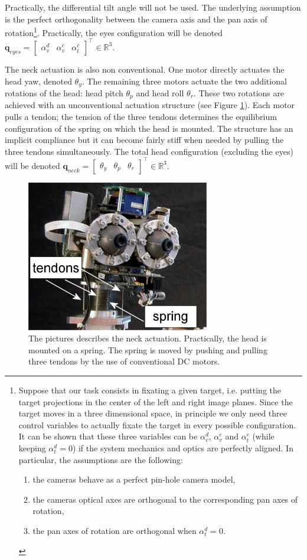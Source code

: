 Practically, the differential tilt angle will not be used. The underlying assumption is the perfect orthogonality between the camera axis and the pan axis of rotation\footnote{\samepage Suppose that our task consists in fixating a given target, i.e. putting the target projections in the center of the left and right image planes. Since the target moves in a three dimensional space, in principle we only need three control variables to actually fixate the target in every possible configuration. It can be shown that these three variables can be $\alpha_v^d$, $\alpha_v^c$ and $\alpha_t^c$ (while keeping $\alpha_t^d=0$) if the system mechanics and optics are perfectly aligned. In particular, the assumptions are the following:
\begin{enumerate}
\item the cameras behave as a perfect pin-hole camera model,
\item the cameras optical axes are orthogonal to the corresponding pan axes of rotation,
\item the pan axes of rotation are orthogonal when $\alpha_t^d=0$.
\end{enumerate}}. Practically, the eyes configuration will be denoted $\mathbf q_{eyes} = \begin{bmatrix} \alpha_v^d & \alpha_v^c & \alpha_t^c \end{bmatrix}^\top \in \mathbb R^3$.


The neck actuation is also non conventional. One motor directly actuates the head yaw, denoted $\theta_y$. The remaining three motors actuate the two additional rotations of the head: head pitch $\theta_p$ and head roll $\theta_r$. These two rotations are achieved with an unconventional actuation structure (see Figure \ref{Fig:Head}). Each motor pulls a tendon; the tension of the three tendons determines the equilibrium configuration of the spring on which the head is mounted. The structure has an implicit compliance but it can become fairly stiff when needed by pulling the three tendons simultaneously. The total head configuration (excluding the eyes) will be denoted $\mathbf q_{neck} = \begin{bmatrix} \theta_y & \theta_p & \theta_r \end{bmatrix}^\top \in \mathbb R^3$.

\begin{figure}
\centering
\includegraphics[width=80mm]{Figure/Head.eps}
\caption{The pictures describes the neck actuation. Practically, the head is mounted on a spring. The spring is moved by pushing and pulling three tendons by the use of conventional DC motors.}
\label{Fig:Head}
\end{figure}

